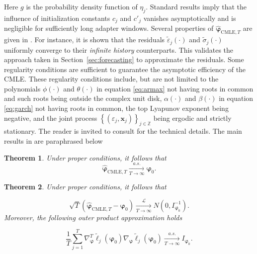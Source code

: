 \documentclass{rQUF2e}
\newcommand{\Z}{\mathbb{Z}}
\theoremstyle{plain}
\newtheorem{theorem}{Theorem}[section]
\theoremstyle{definition}
\theoremstyle{remark}
\begin{document}
Here $g$ is the probability density function of $\eta_j$. Standard results imply that the influence of initialization constants $c_j$ and $c'_j$ vanishes asymptotically and is negligible for sufficiently long adapter windows. Several properties of $\hat{\boldsymbol{\varphi}}_{\mathrm{CMLE}, T}$ are given in \citep{mejia2026asymptotic}. For instance, it is shown that the residuals $\tilde{\varepsilon}_j(\cdot)$ and $\tilde{\sigma}_j(\cdot)$ uniformly converge to their \textit{infinite history} counterparts. This validates the approach taken in Section~\ref{sec:forecasting} to approximate the residuals. Some regularity conditions are sufficient to guarantee the asymptotic efficiency of the CMLE. These regularity conditions include, but are not limited to the polynomials $\phi(\cdot)$ and $\theta(\cdot)$ in equation \eqref{eq:armax} not having roots in common and such roots being outside the complex unit disk, $\alpha(\cdot)$ and $\beta(\cdot)$ in equation \eqref{eq:garch} not having roots in common, the top Lyapunov exponent being negative, and the joint process $\left\{ \left( \varepsilon_j, \mathbf{x}_j \right)  \right\}_{j \in \Z}$ being ergodic and strictly stationary. The reader is invited to consult \citep{mejia2026asymptotic} for the technical details. The main results in \citep{mejia2026asymptotic} are paraphrased below

\begin{theorem}
    Under proper conditions, it follows that
    $$
        \hat{\boldsymbol{\varphi}}_{\mathrm{CMLE}, T} \xrightarrow[T \rightarrow \infty]{a.s.} \boldsymbol{\varphi}_0.
    $$
    \label{thm:consistency}
\end{theorem}

\begin{theorem}
    Under proper conditions, it follows that

    $$
        \sqrt{T} (\hat{\boldsymbol{\varphi}}_{\mathrm{CMLE}, T} - \boldsymbol{\varphi}_0) \xrightarrow[T \rightarrow \infty]{\mathcal{L}} N \left(0, I^{-1}_{\boldsymbol{\varphi}_0} \right).
    $$
    Moreover, the following outer product approximation holds

    $$
        \frac{1}{T} \sum^T_{j = 1} \nabla^T_{\boldsymbol{\varphi}} \tilde{\ell}_j(\boldsymbol{\varphi}_0) \nabla_{\boldsymbol{\varphi}} \tilde{\ell}_j(\boldsymbol{\varphi}_0) \xrightarrow[T \rightarrow \infty]{a.s.} I_{\boldsymbol{\varphi}_0}.
    $$
    \label{thm:asymptotic_normality}
\end{theorem}
\end{document}
